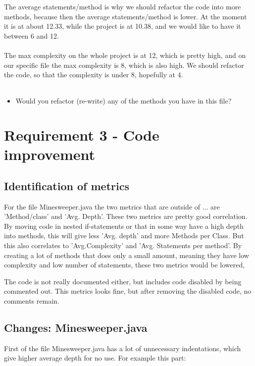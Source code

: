 \documentclass[UKenglish]{article}  %
\begin{document}
The average statements/method is why we should refactor the code into more methods, because then the average statements/method is lower. At the moment it is at about 12.33, while the project is at 10.38, and we would like to have it between 6 and 12. \\\\
The max complexity on the whole project is at 12, which is pretty high, and on our specific file the max complexity is 8, which is also high. We should refactor the code, so that the complexity is under 8, hopefully at 4. \\\\

\begin{itemize}
\item Would you refactor (re-write) any of the methods you have in this file?
\end{itemize}

\section{Requirement 3 - Code improvement}
\subsection{Identification of metrics}
For the file Minesweeper.java the two metrics that are outside of ... are 
'Method/class' and 'Avg. Depth'. These two metrics are pretty good correlation.
By moving code in nested if-statements or that in some way have a high depth 
into methods, this will give less 'Avg. depth' and more Methods per Class. 
But this also correlates to 'Avg.Complexity' and 'Avg. Statements per method'.
By creating a lot of methods that does only a small amount, meaning they have
low complexity and low number of statements, these two metrics would be lowered,

The code is not really documented either, but includes code disabled by being
commented out. This metrics looks fine, but after removing the disabled code,
no comments remain.

\subsection{Changes: Minesweeper.java}
First of the file Minesweeper.java has a lot of unnecessary indentations, which
give higher average depth for no use. For example this part:


\end{document}
